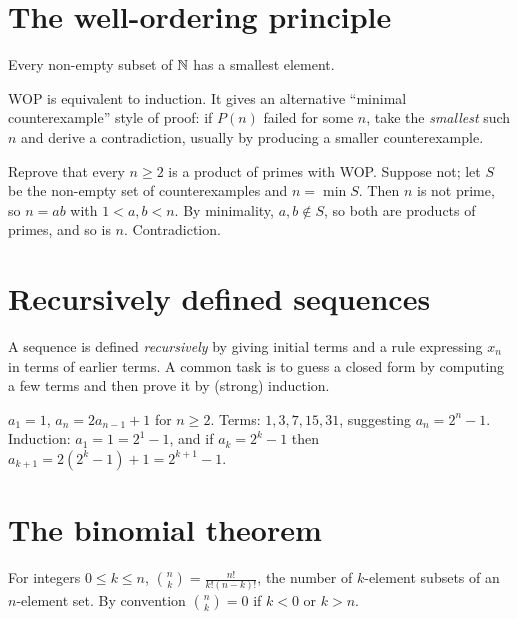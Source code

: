 \section{The well-ordering principle}

\begin{theorem}
Every non-empty subset of $\mathbb{N}$ has a smallest element.
\end{theorem}

WOP is equivalent to induction. It gives an alternative ``minimal counterexample'' style of
proof: if $P(n)$ failed for some $n$, take the \emph{smallest} such $n$ and derive a
contradiction, usually by producing a smaller counterexample.

\begin{example}
Reprove that every $n \geq 2$ is a product of primes with WOP. Suppose not; let $S$ be the
non-empty set of counterexamples and $n = \min S$. Then $n$ is not prime, so $n = ab$ with
$1 < a,b < n$. By minimality, $a,b \notin S$, so both are products of primes, and so is $n$.
Contradiction.
\end{example}

\section{Recursively defined sequences}

A sequence is defined \emph{recursively} by giving initial terms and a rule expressing $x_n$
in terms of earlier terms. A common task is to guess a closed form by computing a few terms
and then prove it by (strong) induction.

\begin{example}
$a_1 = 1$, $a_{n} = 2a_{n-1} + 1$ for $n \geq 2$. Terms: $1, 3, 7, 15, 31$, suggesting
$a_n = 2^n - 1$. Induction: $a_1 = 1 = 2^1 - 1$, and if $a_k = 2^k - 1$ then
$a_{k+1} = 2(2^k - 1) + 1 = 2^{k+1} - 1$.
\end{example}

\section{The binomial theorem}

\begin{definition}
For integers $0 \le k \le n$, $\displaystyle\binom nk = \frac{n!}{k!(n-k)!}$, the number of
$k$-element subsets of an $n$-element set. By convention $\binom nk = 0$ if $k < 0$ or
$k > n$.
\end{definition}


